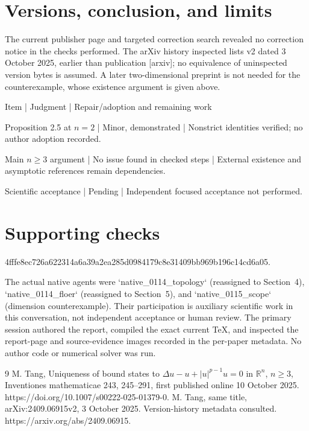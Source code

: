 \documentclass[10pt]{article}
\begin{document}
\section*{Versions, conclusion, and limits}
The current publisher page and targeted correction search revealed no correction notice in the checks performed. The arXiv history inspected lists v2 dated 3 October 2025, earlier than publication [arxiv]; no equivalence of uninspected version bytes is assumed. A later two-dimensional preprint is not needed for the counterexample, whose existence argument is given above.\par
Item | Judgment | Repair/adoption and remaining work\par
Proposition 2.5 at \(n=2\) | Minor, demonstrated | Nonstrict identities verified; no author adoption recorded.\par
Main \(n\ge3\) argument | No issue found in checked steps | External existence and asymptotic references remain dependencies.\par
Scientific acceptance | Pending | Independent focused acceptance not performed.\par
\section*{Supporting checks}
4fffe8ec726a622314a6a39a2ea285d0984179c8e31409bb969b196c14cd6a05.\par
The actual native agents were `native\_0114\_topology` (reassigned to Section 4), `native\_0114\_floer` (reassigned to Section 5), and `native\_0115\_scope` (dimension counterexample). Their participation is auxiliary scientific work in this conversation, not independent acceptance or human review. The primary session authored the report, compiled the exact current TeX, and inspected the report-page and source-evidence images recorded in the per-paper metadata. No author code or numerical solver was run.\par
9 M. Tang, Uniqueness of bound states to \(\Delta u-u+|u|^{p-1}u=0\) in \(\mathbb R^n\), \(n\ge3\), Inventiones mathematicae 243, 245–291, first published online 10 October 2025. https://doi.org/10.1007/s00222-025-01379-0. M. Tang, same title, arXiv:2409.06915v2, 3 October 2025. Version-history metadata consulted. https://arxiv.org/abs/2409.06915.\par
\end{document}
